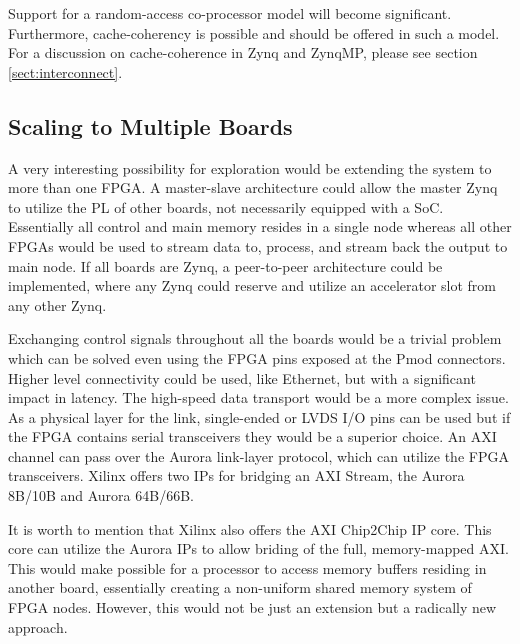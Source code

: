Support for a random-access co-processor model will become significant. 
Furthermore, cache-coherency is possible and should be offered in such a model. 
For a discussion on cache-coherence in Zynq and ZynqMP, please see section \ref{sect:interconnect}.

\subsection{Scaling to Multiple Boards}

A very interesting possibility for exploration would be extending the system to more than one FPGA.
A master-slave architecture could allow the master Zynq to utilize the PL of other boards, not necessarily equipped with a SoC.
Essentially all control and main memory resides in a single node whereas all other FPGAs would be used to stream data to, process,
and stream back the output to main node.
If all boards are Zynq, a peer-to-peer architecture could be implemented, where any Zynq could reserve and utilize an accelerator
slot from any other Zynq.

Exchanging control signals throughout all the boards would be a trivial problem which can be solved even using the FPGA pins exposed at
the Pmod connectors. Higher level connectivity could be used, like Ethernet, but with a significant impact in latency.
The high-speed data transport would be a more complex issue. As a physical layer for the link, single-ended or LVDS I/O pins can be used
but if the FPGA contains serial transceivers they would be a superior choice. An AXI channel can pass over the Aurora link-layer protocol,
which can utilize the FPGA transceivers. Xilinx offers two IPs for bridging an AXI Stream, the Aurora 8B/10B and Aurora 64B/66B.

It is worth to mention that Xilinx also offers the AXI Chip2Chip IP core. This core can utilize the Aurora IPs
to allow briding of the full, memory-mapped AXI. 
This would make possible for a processor to access memory buffers residing in another board, essentially creating a non-uniform 
shared memory system of FPGA nodes. However, this would not be just an extension but a radically new approach.

